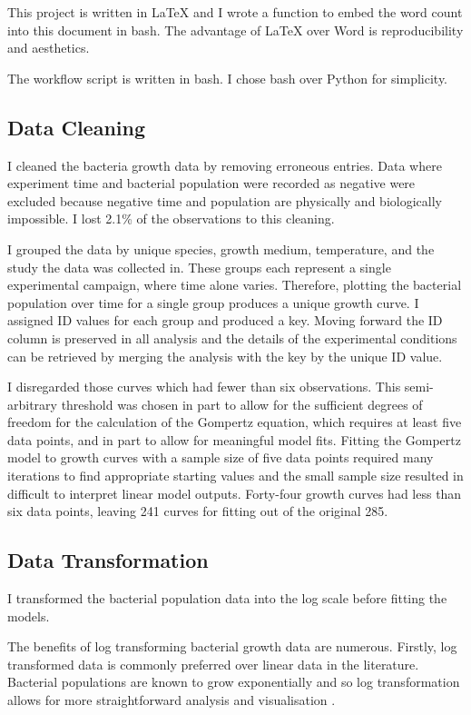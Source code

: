 \documentclass[11pt]{article}
\begin{document}
  This project is written in LaTeX and I wrote a function to embed the word count into this document in bash. The advantage of LaTeX over Word is reproducibility and aesthetics. 

  The workflow script is written in bash. I chose bash over Python for simplicity.  

  \subsection{Data Cleaning}
  I cleaned the bacteria growth data by removing erroneous entries. Data where experiment time and bacterial population were recorded as negative were excluded because negative time and population are physically and biologically impossible. I lost 2.1\% of the observations to this cleaning. 

  I grouped the data by unique species, growth medium, temperature, and the study the data was collected in. These groups each represent a single experimental campaign, where time alone varies. Therefore, plotting the  bacterial population over time for a single group produces a unique growth curve. I assigned ID values for each group and produced a key. Moving forward the ID column is preserved in all analysis and the details of the experimental conditions can be retrieved by merging the analysis with the key by the unique ID value. 

  I disregarded those curves which had fewer than six observations. This semi-arbitrary threshold was chosen in part to allow for the sufficient degrees of freedom for the calculation of the Gompertz equation, which requires at least five data points, and in part to allow for meaningful model fits. Fitting the Gompertz model to growth curves with a sample size of five data points required many iterations to find appropriate starting values and the small sample size resulted in difficult to interpret linear model outputs. Forty-four growth curves had less than six data points, leaving 241 curves for fitting out of the original 285.

  \subsection{Data Transformation}
  I transformed the bacterial population data into the log scale before fitting the models.  

  The benefits of log transforming bacterial growth data are numerous. Firstly, log transformed data is commonly preferred over linear data in the literature. Bacterial populations are known to grow exponentially and so log transformation allows for more straightforward analysis and visualisation \citep{Madigan_Michael2021-07-01}. 
\end{document}
